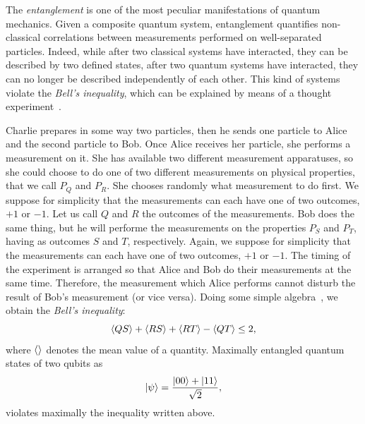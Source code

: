 The \emph{entanglement} is one of the most peculiar manifestations of quantum mechanics. Given a composite quantum system, entanglement quantifies non-classical correlations between measurements performed on well-separated particles. Indeed, while after two classical systems have interacted, they can be described by two defined states, after two quantum systems have interacted, they can no longer be described independently of each other. This kind of systems violate the \emph{Bell's inequality}, which can be explained by means of a thought experiment~\cite{nielsen_chuang}. 

Charlie prepares in some way two particles, then he sends one particle to Alice and the second particle to Bob. Once Alice receives her particle, she performs a measurement on it. She has available two different measurement apparatuses, so she could choose to do one of two different measurements on physical properties, that we call $P_Q$ and $P_R$. She chooses randomly what measurement to do first. We suppose for simplicity that the measurements can each have one of two outcomes, $+1$ or $−1$. Let us call $Q$ and $R$ the outcomes of the measurements. Bob does the same thing, but he will performe the measurements on the properties $P_S$ and $P_T$, having as outcomes $S$ and $T$, respectively. Again, we suppose for simplicity that the measurements can each have one of two outcomes, $+1$ or $−1$. The timing of the experiment is arranged so that Alice and Bob do their measurements at the same time. Therefore, the measurement which Alice performs cannot disturb the result of Bob’s measurement (or vice versa). Doing some simple algebra~\cite{nielsen_chuang}, we obtain the \emph{Bell's inequality}:
\begin{equation*}
    \braket{QS}+\braket{RS}+\braket{RT}-\braket{QT}\leq 2,
\end{equation*}
where $\braket{} $ denotes the mean value of a quantity. 
Maximally entangled quantum states of two qubits as
\begin{equation*}
    \ket{\psi} = \frac{\ket{00}+\ket{11}}{\sqrt{2}},
\end{equation*}
violates maximally the inequality written above.

